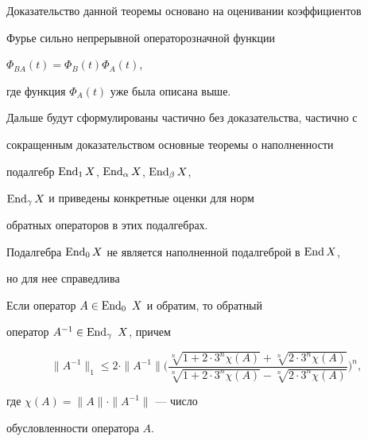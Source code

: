 Доказательство данной теоремы основано на оценивании коэффициентов


Фурье сильно непрерывной операторозначной функции


$\Phi_{BA}(t)=\Phi_B(t)\Phi_A(t)$, 


где функция $\Phi_A(t)$ уже была описана выше.





Дальше будут сформулированы частично без доказательства, частично с


сокращенным доказательством основные теоремы о наполненности


подалгебр $\operatorname{End}_1 X$, $\operatorname{End}_\alpha X$, $\operatorname{End}_\beta X$,


$\operatorname{End}_\gamma X$ и приведены конкретные оценки для норм


обратных операторов в этих подалгебрах.





Подалгебра $\operatorname{End}_0 X$ не является наполненной подалгеброй в $\operatorname{End} X$,


но для нее справедлива





\begin{thm} Если оператор $A\in \operatorname{End}_0 \ X$ и обратим, то обратный


оператор $A^{-1}\in \End_\gamma \ X$, причем


$$


\|A^{-1}\|_1\le 2\cdot \|A^{-1}\|


\biggl(\frac {\sqrt[n]{1+2\cdot 3^n\chi(A)}+


\sqrt[n]{2\cdot 3^n \chi (A)}}


{\sqrt[n]{1+2\cdot 3^n\chi(A)}-


\sqrt[n]{2\cdot 3^n \chi (A)}}\biggr)^n,


$$


где $\chi (A)=\|A\|\cdot\|A^{-1}\|$ --- число


обусловленности оператора $A$.


\end{thm}





